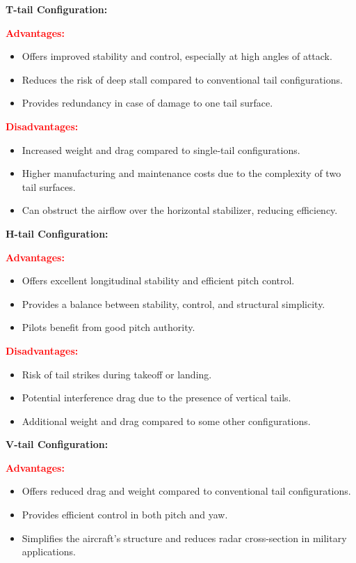 \documentclass[12 pt]{article}
\begin{document}
{{\color{red}\textbf{T-tail Configuration:}}

{\color{black}
\textbf{\textcolor{red}{Advantages:}}
\begin{itemize}
  \item Offers improved stability and control, especially at high angles of attack.
  \item Reduces the risk of deep stall compared to conventional tail configurations.
  \item Provides redundancy in case of damage to one tail surface.
\end{itemize}

\textbf{\textcolor{red}{Disadvantages:}}
\begin{itemize}
  \item Increased weight and drag compared to single-tail configurations.
  \item Higher manufacturing and maintenance costs due to the complexity of two tail surfaces.
  \item Can obstruct the airflow over the horizontal stabilizer, reducing efficiency.
\end{itemize}
}

{\color{red}\textbf{H-tail Configuration:}}

{\color{black}
\textbf{\textcolor{red}{Advantages:}}
\begin{itemize}
  \item Offers excellent longitudinal stability and efficient pitch control.
  \item Provides a balance between stability, control, and structural simplicity.
  \item Pilots benefit from good pitch authority.
\end{itemize}

\textbf{\textcolor{red}{Disadvantages:}}
\begin{itemize}
  \item Risk of tail strikes during takeoff or landing.
  \item Potential interference drag due to the presence of vertical tails.
  \item Additional weight and drag compared to some other configurations.
\end{itemize}
}

{\color{red}\textbf{V-tail Configuration:}}

{\color{black}
\textbf{\textcolor{red}{Advantages:}}
\begin{itemize}
  \item Offers reduced drag and weight compared to conventional tail configurations.
  \item Provides efficient control in both pitch and yaw.
  \item Simplifies the aircraft's structure and reduces radar cross-section in military applications.
\end{itemize}

}}
\end{document}
